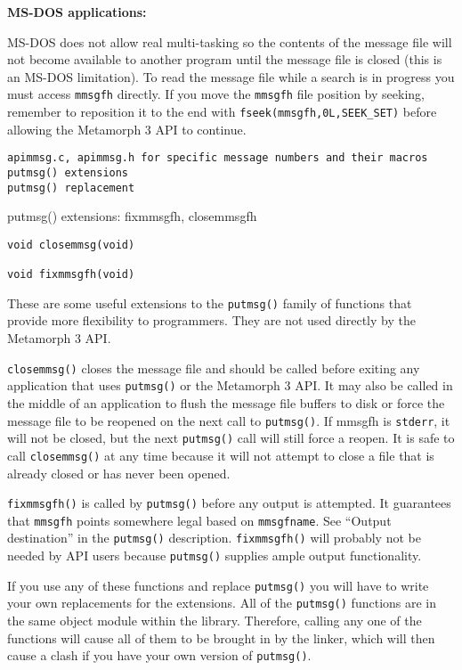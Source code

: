 {\bf MS-DOS applications:}

MS-DOS does not allow real multi-tasking so the contents of the
message file will not become available to another program until
the message file is closed (this is an MS-DOS limitation).  To
read the message file while a search is in progress you must
access \verb`mmsgfh` directly.  If you move the \verb`mmsgfh` file position by
seeking, remember to reposition it to the end with
\verb`fseek(mmsgfh,0L,SEEK_SET)` before allowing the Metamorph 3 API to
continue.

\SEE
\begin{verbatim}
apimmsg.c, apimmsg.h for specific message numbers and their macros
putmsg() extensions
putmsg() replacement
\end{verbatim}

\NAME
{putmsg() extensions: fixmmsgfh, closemmsgfh}

\SYNOPSIS
\begin{verbatim}
void closemmsg(void)

void fixmmsgfh(void)

\end{verbatim}

\DESCRIPTION

These are some useful extensions to the \verb`putmsg()` family of
functions that provide more flexibility to programmers.  They are
not used directly by the Metamorph 3 API.

\verb`closemmsg()` closes the message file and should be called before
exiting any application that uses \verb`putmsg()` or the Metamorph 3 API.
It may also be called in the middle of an application to flush the
message file buffers to disk or force the message file to be
reopened on the next call to \verb`putmsg()`.  If mmsgfh is \verb`stderr`, it
will not be closed, but the next \verb`putmsg()` call will still force a
reopen.  It is safe to call \verb`closemmsg()` at any time because it
will not attempt to close a file that is already closed or has
never been opened.

\verb`fixmmsgfh()` is called by \verb`putmsg()` before any output is attempted.
It guarantees that \verb`mmsgfh` points somewhere legal based on
\verb`mmsgfname`.  See ``Output destination'' in the \verb`putmsg()` description.
\verb`fixmmsgfh()` will probably not be needed by API users because
\verb`putmsg()` supplies ample output functionality.

If you use any of these functions and replace \verb`putmsg()` you will
have to write your own replacements for the extensions.  All of
the \verb`putmsg()` functions are in the same object module within the
library.  Therefore, calling any one of the functions will cause
all of them to be brought in by the linker, which will then cause
a clash if you have your own version of \verb`putmsg()`.

